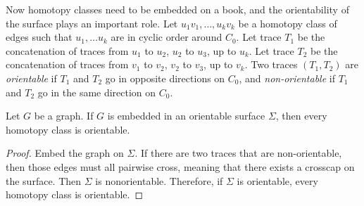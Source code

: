 Now homotopy classes need to be embedded on a book, and the orientability of the surface plays an important role. Let \(u_1 v_1, \ldots, u_k v_k\) be a homotopy class of edges such that $u_1, \ldots u_k$ are in cyclic order around $C_0$. Let trace \(T_1\) be the concatenation of traces from \(u_1\) to \(u_2\), $u_2$ to $u_3$, up to $u_k$. Let trace \(T_2\) be the concatenation of traces from \(v_1\) to \(v_2\), $v_2$ to $v_3$, up to $v_k$.
Two traces $(T_1, T_2)$ are \textit{orientable} if \(T_1\) and \(T_2\) go in opposite directions on $C_0$, and \textit{non-orientable} if \(T_1\) and \(T_2\) go in the same direction on $C_0$.

\begin{lemma}
	Let $G$ be a graph. If \(G\) is embedded in an orientable surface $\Sigma$, then every homotopy class is orientable.
\end{lemma}
\begin{proof}
	Embed the graph on $\Sigma$. If there are two traces that are non-orientable, then those edges must all pairwise cross, meaning that there exists a crosscap on the surface. Then $\Sigma$ is nonorientable. Therefore, if $\Sigma$ is orientable, every homotopy class is orientable. 
\end{proof}

